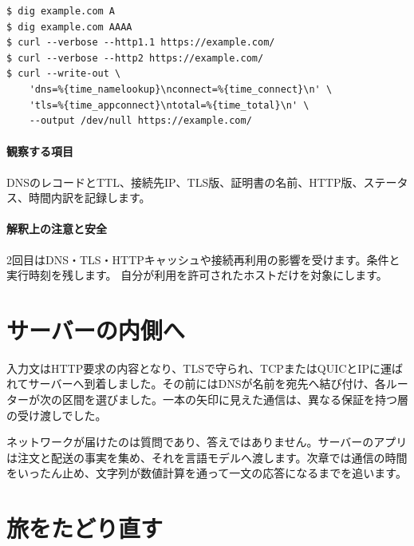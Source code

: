 \begingroup
\begingroup
      \begin{lstlisting}[basicstyle=\ttfamily\fontsize{7}{8.4}\selectfont]
$ dig example.com A
$ dig example.com AAAA
$ curl --verbose --http1.1 https://example.com/
$ curl --verbose --http2 https://example.com/
$ curl --write-out \
    'dns=%{time_namelookup}\nconnect=%{time_connect}\n' \
    'tls=%{time_appconnect}\ntotal=%{time_total}\n' \
    --output /dev/null https://example.com/
      \end{lstlisting}
\par
\endgroup
\medskip
\begingroup
\paragraph{観察する項目}
        DNSのレコードとTTL、接続先IP、TLS版、証明書の名前、HTTP版、ステータス、時間内訳を記録します。

\paragraph{解釈上の注意と安全}
        2回目はDNS・TLS・HTTPキャッシュや接続再利用の影響を受けます。条件と実行時刻を残します。
        自分が利用を許可されたホストだけを対象にします。

\par
\endgroup
\par
\endgroup


\section{サーバーの内側へ}
\label{sec:05-network-22}

入力文はHTTP要求の内容となり、TLSで守られ、TCPまたはQUICとIPに運ばれてサーバーへ到着しました。その前にはDNSが名前を宛先へ結び付け、各ルーターが次の区間を選びました。一本の矢印に見えた通信は、異なる保証を持つ層の受け渡しでした。

ネットワークが届けたのは質問であり、答えではありません。サーバーのアプリは注文と配送の事実を集め、それを言語モデルへ渡します。次章では通信の時間をいったん止め、文字列が数値計算を通って一文の応答になるまでを追います。



\section{旅をたどり直す}
\label{sec:05-network-23}

